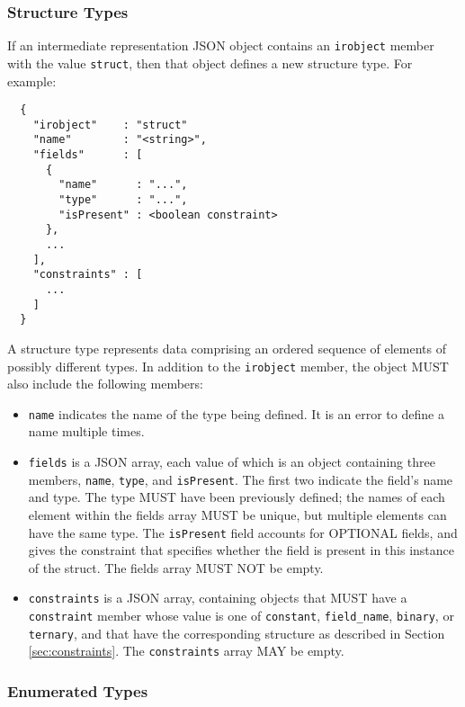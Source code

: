 \documentclass[10pt,twocolumn,a4paper]{article}
\begin{document}
\subsubsection{Structure Types}

If an intermediate representation JSON object contains an \texttt{irobject}
member with the value \texttt{struct}, then that object defines a new
structure type. For example:

\begin{verbatim}
  {
    "irobject"    : "struct"
    "name"        : "<string>",
    "fields"      : [
      {
        "name"      : "...",
        "type"      : "...",
        "isPresent" : <boolean constraint>
      },
      ...
    ],
    "constraints" : [
      ...
    ]
  }
\end{verbatim}

A structure type represents data comprising an ordered sequence of elements
of possibly different types. In addition to the \texttt{irobject} member, 
the object MUST also include the following members:
\begin{itemize}
  \item \texttt{name} indicates the name of the type being defined. It is
    an error to define a name multiple times.
  \item \texttt{fields} is a JSON array, each value of which is an object
    containing three members, \texttt{name}, \texttt{type}, and \texttt{isPresent}.
    The first two indicate the field's name and type. The type MUST have
    been previously defined; the names of each element within the fields
    array MUST be unique, but multiple elements can have the same type.
    The \texttt{isPresent} field accounts for OPTIONAL fields, and gives
    the constraint that specifies whether the field is present in this
    instance of the struct.
    The fields array MUST NOT be empty.
  \item \texttt{constraints} is a JSON array, containing objects that MUST have a
    \texttt{constraint} member whose value is one of \texttt{constant},
    \texttt{field\_name}, \texttt{binary}, or \texttt{ternary}, and that have the
    corresponding structure as described in Section \ref{sec:constraints}. The
    \texttt{constraints} array MAY be empty.
\end{itemize}

\subsubsection{Enumerated Types}
\end{document}
